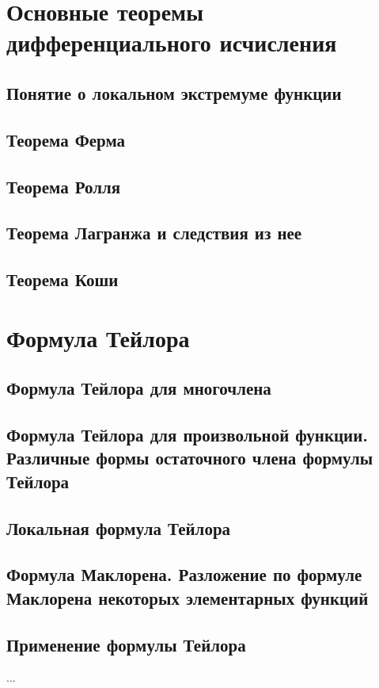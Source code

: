 \section{Основные теоремы дифференциального исчисления}
\subsection{Понятие о локальном экстремуме функции}

\subsection{Теорема Ферма}

\subsection{Теорема Ролля}

\subsection{Теорема Лагранжа и следствия из нее}

\subsection{Теорема Коши}


\section{Формула Тейлора}
\subsection{Формула Тейлора для многочлена}
\subsection{Формула Тейлора для произвольной функции. Различные формы остаточного члена формулы Тейлора}
\subsection{Локальная формула Тейлора}
\subsection{Формула Маклорена. Разложение по формуле Маклорена некоторых элементарных функций}
\subsection{Применение формулы Тейлора}
...

